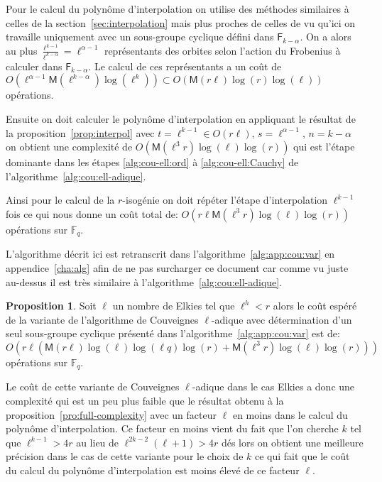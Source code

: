 \documentclass[10pt,a4paper]{book}
\theoremstyle{plain}
\theoremstyle{definition}
\theoremstyle{definition}
\theoremstyle{definition}
\newtheorem{prop}[thm]{Proposition}
\theoremstyle{definition}
\theoremstyle{remark}
\theoremstyle{remark}
\theoremstyle{definition}
\begin{document}
Pour le calcul du polynôme d'interpolation on utilise des méthodes 
similaires à celles de la section~\ref{sec:interpolation} mais plus proches de 
celles de \cite[§5]{DeFeo11} vu qu'ici on travaille uniquement avec un sous-groupe 
cyclique défini dans $\mathsf{F}_{k-\alpha}$. 
On a alors au plus $\frac{\ell^{k-1}}{\ell^{k-\alpha}}=\ell^{\alpha-1}$ représentants 
des orbites selon l'action du Frobenius à calculer dans $\mathsf{F}_{k-\alpha}$.
Le calcul de ces représentants a un coût de 
$O(\ell^{\alpha-1}\mathsf{M}(\ell^{k-\alpha})\log(\ell^k)) \subset O(\mathsf{M}(r\ell)\log(r)\log(\ell))$ opérations.

Ensuite on doit calculer le polynôme d'interpolation en appliquant le résultat
 de la proposition~\ref{prop:interpol} avec $t=\ell^{k-1} \in O(r \ell)$, $s=\ell^{\alpha-1}$, 
 $n=k-\alpha$ on obtient une complexité de 
 $O(\mathsf{M}(\ell^3r)\log(\ell)\log(r))$ qui est l'étape dominante dans les
 étapes \ref{alg:cou-ell:ord} à \ref{alg:cou-ell:Cauchy} de 
 l'algorithme~\ref{alg:cou:ell-adique}.

Ainsi pour le calcul de la $r$-isogénie on doit répéter l'étape d'interpolation 
$\ell^{k-1}$ fois ce qui nous donne un coût total de: 
$O(r \ell \mathsf{M}(\ell^3r)\log(\ell)\log(r))$ opérations sur $\mathbb{F}_q$.

L'algorithme décrit ici est retranscrit dans l'algorithme~\ref{alg:app:cou:var}
en appendice~\ref{cha:alg} afin de ne pas surcharger ce document car comme vu 
juste au-dessus il est très similaire à l'algorithme~\ref{alg:cou:ell-adique}.

\begin{prop}
Soit $\ell$ un nombre de Elkies tel que $\ell^h<r$ alors le coût espéré de la 
variante de l'algorithme de Couveignes $\ell$-adique avec détermination d'un 
seul sous-groupe cyclique présenté dans l'algorithme~\ref{alg:app:cou:var} 
est de: 
\[
O(r \ell (\mathsf{M}(r\ell)\log(\ell)\log(\ell q) \log(r) + \mathsf{M}(\ell^3r)\log(\ell)\log(r) ))
\]
opérations sur $\mathbb{F}_q$.
\end{prop}

Le coût de cette variante de Couveignes $\ell$-adique dans le cas Elkies a donc
une complexité qui est un peu plus faible que le résultat obtenu à la 
proposition~\ref{pro:full-complexity} avec un facteur $\ell$ en moins dans le 
calcul du polynôme d'interpolation. Ce facteur en moins vient du fait que l'on
cherche $k$ tel que $\ell^{k-1} >4r$ au lieu de $\ell^{2k-2}(\ell+1)>4r$ dés 
lors on obtient une meilleure précision dans le cas de cette variante pour le 
choix de $k$ ce qui fait que le coût du calcul du polynôme d'interpolation est
moins élevé de ce facteur $\ell$. 
\end{document}
